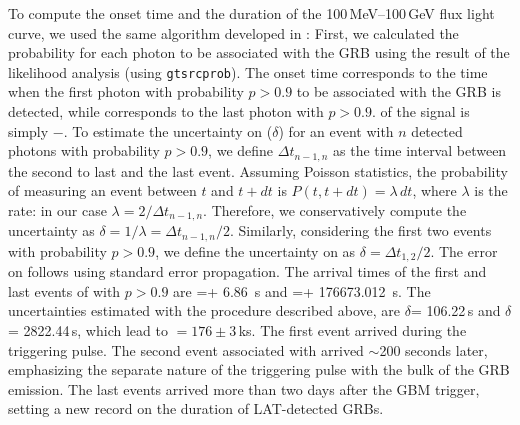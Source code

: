 \documentclass[preprint]{aastex631}
\begin{document}
To compute the onset time and the duration of the 100\,MeV--100\,GeV flux light curve, we used the same algorithm developed in \citet{2FLGC}: First, we calculated the probability for each photon to be associated with the GRB using the result of the likelihood analysis (using \texttt{gtsrcprob}). 
The onset time \tz corresponds to the time when the first photon with probability $p > 0.9$ to be associated with the GRB is detected, while \tone corresponds to the last photon with $p > 0.9$. \toz of the signal is simply \tone$- $\tz. 
To estimate the uncertainty on \tone ($\delta$\tone) for an event with $n$ detected photons with probability $p > 0.9$, we define $\Delta t_{n-1,n}$ as the time interval between the second to last and the last event. Assuming Poisson statistics, the probability of measuring an event between $t$ and $t+dt$ is $P(t,t+dt) = \lambda\,dt$, where $\lambda$ is the rate: in our case $\lambda = 2/\Delta t_{n-1,n}$. Therefore, we conservatively compute the uncertainty as $\delta$\tone$ = 1/\lambda = \Delta t_{n-1,n}/2$. Similarly, considering the first two events with probability $p > 0.9$, we define the uncertainty on \tz as $\delta$\tz$= \Delta t_{1,2}/2$. The error on \toz follows using standard error propagation.
The arrival times of the first and last events of \grb with $p > 0.9$ are \tz=\trig+ 6.86~s and \tone=\trig+ 176673.012~s. 
The uncertainties estimated with the procedure described above, are $\delta$\tz= 106.22\,s and $\delta$\tone= 2822.44\,s, which lead to \toz$=176 \pm 3$\,ks. The first event arrived during the triggering pulse. The second event associated with \grb arrived $\sim$200 seconds later, emphasizing the separate nature of the triggering pulse with the bulk of the GRB emission. The last events arrived more than two days after the GBM trigger, setting a new record on the duration of LAT-detected GRBs. 
\end{document}
